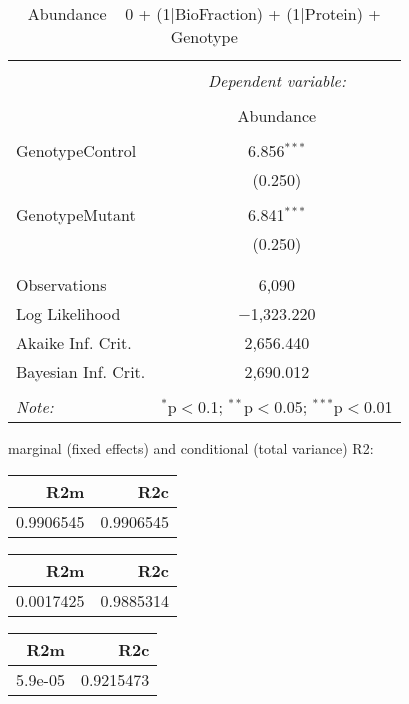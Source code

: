\documentclass[11pt]{report}
\begin{document}
\begin{table}[!htbp] \centering 
  \caption{Abundance ~ 0 + (1|BioFraction) + (1|Protein) + Genotype} 
  \label{} 
\begin{tabular}{@{\extracolsep{5pt}}lc} 
\\[-1.8ex]\hline 
\hline \\[-1.8ex] 
 & \multicolumn{1}{c}{\textit{Dependent variable:}} \\ 
\cline{2-2} 
\\[-1.8ex] & Abundance \\ 
\hline \\[-1.8ex] 
 GenotypeControl & 6.856$^{***}$ \\ 
  & (0.250) \\ 
  & \\ 
 GenotypeMutant & 6.841$^{***}$ \\ 
  & (0.250) \\ 
  & \\ 
\hline \\[-1.8ex] 
Observations & 6,090 \\ 
Log Likelihood & $-$1,323.220 \\ 
Akaike Inf. Crit. & 2,656.440 \\ 
Bayesian Inf. Crit. & 2,690.012 \\ 
\hline 
\hline \\[-1.8ex] 
\textit{Note:}  & \multicolumn{1}{r}{$^{*}$p$<$0.1; $^{**}$p$<$0.05; $^{***}$p$<$0.01} \\ 
\end{tabular} 
\end{table} 
marginal (fixed effects) and conditional (total variance) R2:

\begin{tabular}{r|r}
\hline
R2m & R2c\\
\hline
0.9906545 & 0.9906545\\
\hline
\end{tabular}

\begin{tabular}{r|r}
\hline
R2m & R2c\\
\hline
0.0017425 & 0.9885314\\
\hline
\end{tabular}

\begin{tabular}{r|r}
\hline
R2m & R2c\\
\hline
5.9e-05 & 0.9215473\\
\hline
\end{tabular}
\end{document}

